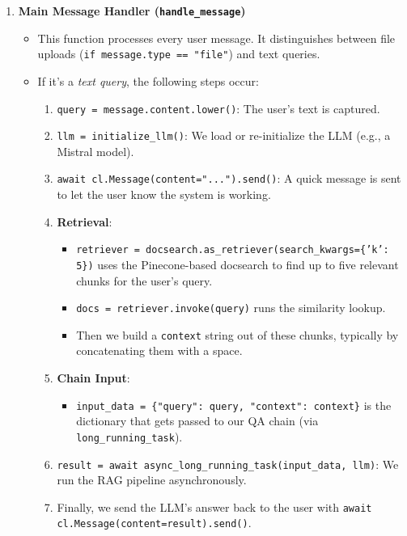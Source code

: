 \begin{enumerate}
    \item \textbf{Main Message Handler (\texttt{handle\_message})}
    \begin{itemize}
        \item This function processes every user message. It distinguishes between file uploads (\texttt{if message.type == "file"}) and text queries.
        \item If it’s a \emph{text query}, the following steps occur:
        \begin{enumerate}
            \item \texttt{query = message.content.lower()}: The user’s text is captured.
            \item \texttt{llm = initialize\_llm()}: We load or re-initialize the LLM (e.g., a Mistral model). 
            \item \texttt{await cl.Message(content="...").send()}: A quick message is sent to let the user know the system is working.
            \item \textbf{Retrieval}: 
            \begin{itemize}
                \item \texttt{retriever = docsearch.as\_retriever(search\_kwargs=\{'k': 5\})} uses the Pinecone-based docsearch to find up to five relevant chunks for the user’s query.
                \item \texttt{docs = retriever.invoke(query)} runs the similarity lookup. 
                \item Then we build a \texttt{context} string out of these chunks, typically by concatenating them with a space.
            \end{itemize}
            \item \textbf{Chain Input}: 
            \begin{itemize}
                \item \texttt{input\_data = \{"query": query, "context": context\}} is the dictionary that gets passed to our QA chain (via \texttt{long\_running\_task}).
            \end{itemize}
            \item \texttt{result = await async\_long\_running\_task(input\_data, llm)}: We run the RAG pipeline asynchronously.
            \item Finally, we send the LLM’s answer back to the user with \texttt{await cl.Message(content=result).send()}.
        \end{enumerate}
    \end{itemize}


\end{enumerate}
